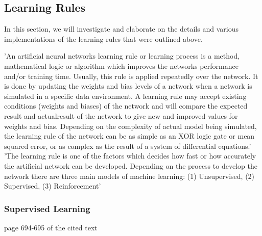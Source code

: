\subsection{Learning Rules}

In this section, we will investigate and elaborate on the details and various implementations of the learning rules that were outlined above.

'An artificial neural networks learning rule or learning process is a method, mathematical logic or algorithm which improves the networks performance and/or training time. Usually, this rule is applied repeatedly over the network. It is done by updating the weights and bias levels of a network when a network is simulated in a specific data environment. A learning rule may accept existing conditions (weights and biases) of the network and will compare the expected result and actualresult of the network to give new and improved values for weights and bias. Depending on the complexity of actual model being simulated, the learning rule of the network can be as simple as an XOR logic gate or mean squared error, or as complex as the result of a system of differential equations.'
'The learning rule is one of the factors which decides how fast or how accurately the artificial network can be developed. Depending on the process to develop the network there are three main models of machine learning: (1) Unsupervised, (2) Supervised, (3) Reinforcement'



\subsubsection{Supervised Learning}

page 694-695 of the cited text


